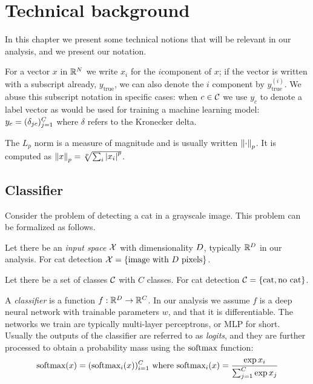 \documentclass[../main.tex]{subfiles}
\begin{document}
\chapter{Technical background}
\label{ch:background}

In this chapter we present some technical notions that will be relevant in our analysis, and we present our notation.

For a vector $x$ in $\mathbb{R}^N$ we write $x_i$ for the $i$\nth component of $x$; if the vector is written with a subscript already, \eg{} $y_\text{true}$, we can also denote the $i$\nth{} component by $y^{(i)}_\text{true}$.
We abuse this subscript notation in specific cases:
when $c \in \mathcal{C}$ we use $y_c$ to denote a label vector as would be used for training a machine learning model: $y_c = (\delta_{jc})_{j=1}^{C}$ where $\delta$ refers to the Kronecker delta.

The $L_p$ norm is a measure of magnitude and is usually written $\left\lVert\cdot\right\rVert_p$.
It is computed as $\left\lVert x\right\rVert_p = \sqrt[p]{\sum_i \left\lvert x_i\right\rvert^p}$.

\section{Classifier}

Consider the problem of detecting a cat in a grayscale image. This problem can be formalized as follows.

Let there be an \emph{input space} $\mathcal{X}$ with dimensionality $D$, typically $\mathbb{R}^D$ in our analysis. For cat detection $\mathcal{X} = \{\text{image with $D$ pixels}\}$.

Let there be a set of classes $\mathcal{C}$ with $C$ classes. For cat detection $\mathcal{C} = \{\text{cat}, \text{no cat}\}$.

A \emph{classifier} is a function $f: \mathbb{R}^D \to \mathbb{R}^C$. In our analysis we assume $f$ is a deep neural network with trainable parameters $w$, and that it is differentiable. The networks we train are typically multi-layer perceptrons, or MLP for short.
Usually the outputs of the classifier are referred to as \emph{logits}, and they are further processed to obtain a probability mass using the $\text{softmax}$ function:
\begin{equation}
    \text{softmax}(x) = (\text{softmax}_i(x))_{i=1}^{C} \text{ where }
    \text{softmax}_i(x) = \frac{\exp x_i}{\sum_{j=1}^{C} \exp x_j}
\end{equation}
\end{document}
